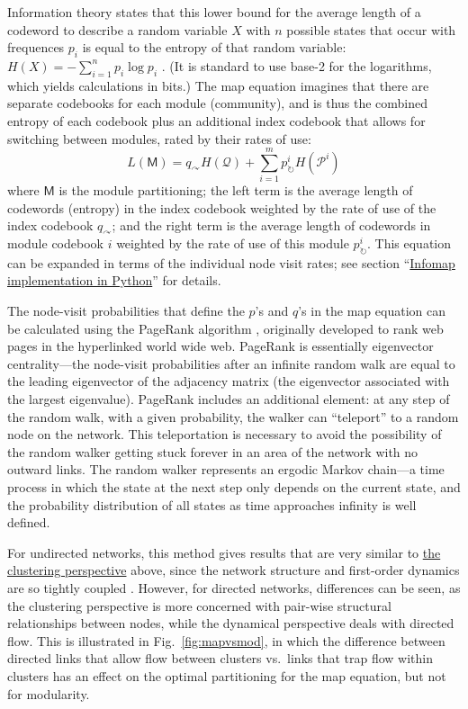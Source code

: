 Information theory states that this lower bound for the average length
of a codeword to describe a random variable \(X\) with \(n\) possible
states that occur with frequences \(p_i\) is equal to the entropy of
that random variable: \(H(X) = -\sum_{i=1}^{n}{p_i\log{p_i}}\)
\autocite{cover_elements_2012}. (It is standard to use base-2 for the
logarithms, which yields calculations in bits.) The map equation
imagines that there are separate codebooks for each module (community),
and is thus the combined entropy of each codebook plus an additional
index codebook that allows for switching between modules, rated by their
rates of use:
\[L(\mathsf{M}) = q_{\curvearrowright} H(\mathcal{Q}) + \sum_{i=1}^{m}{p_{\circlearrowright}^{i} H(\mathcal{P}^i)}\]
where \(\mathsf{M}\) is the module partitioning; the left term is the
average length of codewords (entropy) in the index codebook weighted by
the rate of use of the index codebook \(q_{\curvearrowright}\); and the
right term is the average length of codewords in module codebook \(i\)
weighted by the rate of use of this module
\(p_{\circlearrowright}^{i}\). This equation can be expanded in terms of
the individual node visit rates; see section
``\protect\hyperlink{pyinfomap}{Infomap implementation in Python}'' for
details.

The node-visit probabilities that define the \(p\)'s and \(q\)'s in the
map equation can be calculated using the PageRank algorithm
\autocite{page_pagerank_1999}, originally developed to rank web pages in
the hyperlinked world wide web. PageRank is essentially eigenvector
centrality---the node-visit probabilities after an infinite random walk
are equal to the leading eigenvector of the adjacency matrix (the
eigenvector associated with the largest eigenvalue). PageRank includes
an additional element: at any step of the random walk, with a given
probability, the walker can ``teleport'' to a random node on the
network. This teleportation is necessary to avoid the possibility of the
random walker getting stuck forever in an area of the network with no
outward links. The random walker represents an ergodic Markov chain---a
time process in which the state at the next step only depends on the
current state, and the probability distribution of all states as time
approaches infinity is well defined.

For undirected networks, this method gives results that are very similar
to \protect\hyperlink{the-clustering-perspective}{the clustering
perspective} above, since the network structure and first-order dynamics
are so tightly coupled \autocite{schaub_many_2017}. However, for
directed networks, differences can be seen, as the clustering
perspective is more concerned with pair-wise structural relationships
between nodes, while the dynamical perspective deals with directed flow.
This is illustrated in Fig.~\ref{fig:mapvsmod}, in which the difference
between directed links that allow flow between clusters vs.~links that
trap flow within clusters has an effect on the optimal partitioning for
the map equation, but not for modularity.


